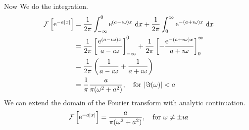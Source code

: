 \begin{Example}
  Now We do the integration.
  \begin{align*} 
    \mathcal{F}\left[ \mathop{\mathrm{e}}\nolimits^{-a |x|} \right]
    &= \frac{1}{2\pi} \int_{-\infty}^0 \mathop{\mathrm{e}}\nolimits^{( a - \imath \omega ) x}\,\mathrm{d} x + 
    \frac{1}{2\pi} \int_0^\infty \mathop{\mathrm{e}}\nolimits^{-(a + \imath \omega) x}\,\mathrm{d} x 
    \\
    &= \frac{1}{2\pi} \left[ \frac{\mathop{\mathrm{e}}\nolimits^{(a - \imath \omega)x}}{a - \imath \omega} \right]_{-\infty}^0 + 
    \frac{1}{2\pi} \left[ -\frac{\mathop{\mathrm{e}}\nolimits^{-(a + \imath \omega) x}}{a + \imath \omega} \right]_0^\infty 
    \\
    &= \frac{1}{2\pi} \left( \frac{1}{a - \imath \omega} + \frac{1}{a + \imath \omega} \right) 
    \\
    &= \frac{1}{\pi} \frac{a}{\pi (\omega^2 + a^2)}, \quad \mathrm{for}\ |\Im(\omega)| < a
  \end{align*}
  We can extend the domain of the Fourier transform with analytic continuation.
  \[ 
  \mathcal{F}\left[\mathop{\mathrm{e}}\nolimits^{-a |x|}\right] = 
  \frac{a}{\pi (\omega^2 + a^2)}, \quad \mathrm{for}\ \omega \neq \pm \imath a
  \]
\end{Example}













